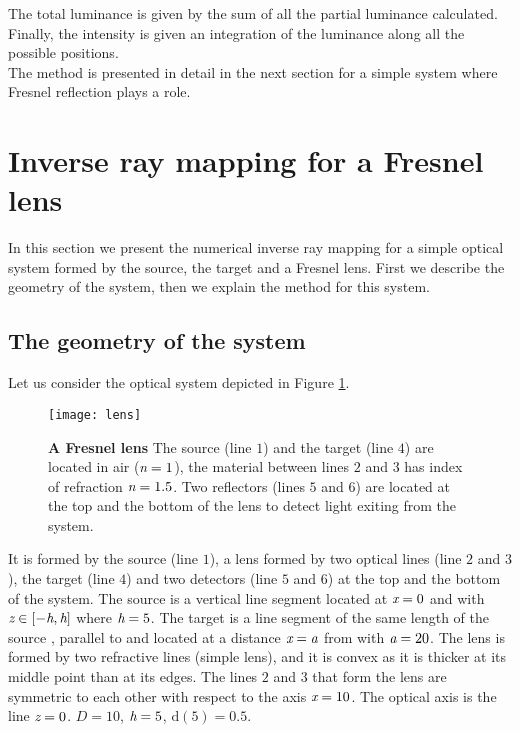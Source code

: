 The total luminance is given by the sum of all the partial luminance calculated.
Finally, the intensity is given an integration of the luminance along all the possible positions.
\\ \indent
The method is presented in detail in the next section for a simple system where Fresnel reflection plays a role.
\section{Inverse ray mapping for a Fresnel lens}
In this section we present the numerical  inverse ray mapping for a simple optical system formed by the source, the target and a Fresnel lens.
First we describe the geometry of the system, then we explain the method for this system.
\subsection{The geometry of the system}
Let us consider the optical system depicted in Figure \ref{fig:lens}. 
\begin{figure}[h]
  \begin{center}
  \texttt{[image: lens]}
  \end{center}
  \caption{\textbf{A Fresnel lens}
The source (line $1$) and the target (line $4$) are located in air ($\textit{n} = 1$), the material between lines $2$ and $3$ has index of refraction $\textit{n}=1.5$. 
Two reflectors (lines $5$ and $6$) are located at the top and the bottom of the lens to detect light exiting from the system.}
\label{fig:lens}
 \end{figure}
It is formed by the source (line $1$), a lens formed by two optical lines (line $2$ and $3$), the target (line $4$) and two detectors (line $5$ and $6$) at the top and the bottom of the system. The source  is a vertical line segment located at $\textit{x}=0$ and with 
$\textit{z}\in[-\textit{h}, \textit{h}]$ where $\textit{h}=5$. The target  is a line segment of the same length of the source , parallel to  and located at a distance $\textit{x}=\textit{a}$ from  with $\textit{a} = 20$. The lens is formed by two refractive lines (simple lens), and it is convex as it is thicker at its middle point than at its edges.
The lines $2$ and $3$ that form the lens are symmetric to each other with respect to the axis $\textit{x}=10$. The optical axis is the line $\textit{z}=0$. $D=10$, $\textit{h}=5$, $\textrm{d}(5)=0.5$.
